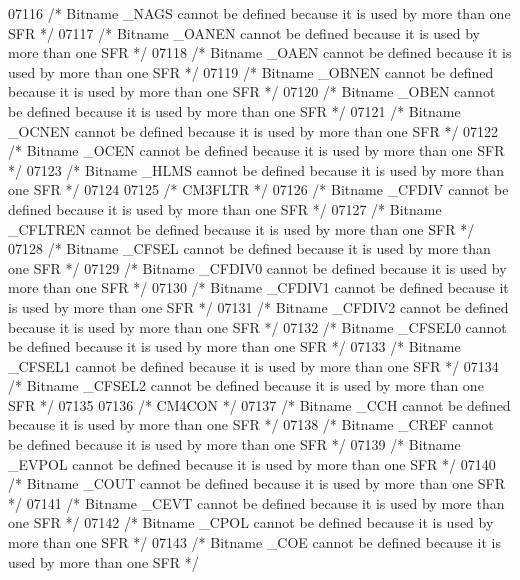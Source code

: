 \begin{DoxyCode}
07116 \textcolor{comment}{/* Bitname \_NAGS cannot be defined because it is used by more than one SFR */}
07117 \textcolor{comment}{/* Bitname \_OANEN cannot be defined because it is used by more than one SFR */}
07118 \textcolor{comment}{/* Bitname \_OAEN cannot be defined because it is used by more than one SFR */}
07119 \textcolor{comment}{/* Bitname \_OBNEN cannot be defined because it is used by more than one SFR */}
07120 \textcolor{comment}{/* Bitname \_OBEN cannot be defined because it is used by more than one SFR */}
07121 \textcolor{comment}{/* Bitname \_OCNEN cannot be defined because it is used by more than one SFR */}
07122 \textcolor{comment}{/* Bitname \_OCEN cannot be defined because it is used by more than one SFR */}
07123 \textcolor{comment}{/* Bitname \_HLMS cannot be defined because it is used by more than one SFR */}
07124 
07125 \textcolor{comment}{/* CM3FLTR */}
07126 \textcolor{comment}{/* Bitname \_CFDIV cannot be defined because it is used by more than one SFR */}
07127 \textcolor{comment}{/* Bitname \_CFLTREN cannot be defined because it is used by more than one SFR */}
07128 \textcolor{comment}{/* Bitname \_CFSEL cannot be defined because it is used by more than one SFR */}
07129 \textcolor{comment}{/* Bitname \_CFDIV0 cannot be defined because it is used by more than one SFR */}
07130 \textcolor{comment}{/* Bitname \_CFDIV1 cannot be defined because it is used by more than one SFR */}
07131 \textcolor{comment}{/* Bitname \_CFDIV2 cannot be defined because it is used by more than one SFR */}
07132 \textcolor{comment}{/* Bitname \_CFSEL0 cannot be defined because it is used by more than one SFR */}
07133 \textcolor{comment}{/* Bitname \_CFSEL1 cannot be defined because it is used by more than one SFR */}
07134 \textcolor{comment}{/* Bitname \_CFSEL2 cannot be defined because it is used by more than one SFR */}
07135 
07136 \textcolor{comment}{/* CM4CON */}
07137 \textcolor{comment}{/* Bitname \_CCH cannot be defined because it is used by more than one SFR */}
07138 \textcolor{comment}{/* Bitname \_CREF cannot be defined because it is used by more than one SFR */}
07139 \textcolor{comment}{/* Bitname \_EVPOL cannot be defined because it is used by more than one SFR */}
07140 \textcolor{comment}{/* Bitname \_COUT cannot be defined because it is used by more than one SFR */}
07141 \textcolor{comment}{/* Bitname \_CEVT cannot be defined because it is used by more than one SFR */}
07142 \textcolor{comment}{/* Bitname \_CPOL cannot be defined because it is used by more than one SFR */}
07143 \textcolor{comment}{/* Bitname \_COE cannot be defined because it is used by more than one SFR */}

\end{DoxyCode}
